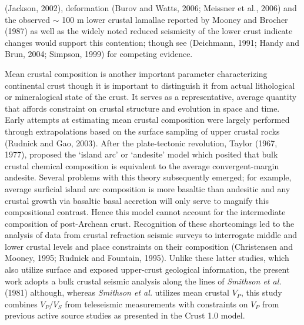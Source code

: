 \documentclass[review]{elsarticle}
\begin{document}
(Jackson, 2002), deformation (Burov and Watts, 2006; Meissner et al., 2006) and the observed $\sim$ 100 m lower crustal lamallae reported by Mooney and Brocher (1987) as well as the widely noted reduced seismicity of the lower crust indicate changes would support this contention; though see (Deichmann, 1991; Handy and Brun, 2004; Simpson, 1999) for competing evidence.

Mean crustal composition is another important parameter characterizing continental crust though it is important to distinguish it from actual lithological or mineralogical state of the crust. It serves as a representative, average quantity that affords constraint on crustal structure and evolution in space and time. Early attempts at estimating mean crustal composition were largely performed through extrapolations based on the surface sampling of upper crustal rocks (Rudnick and Gao, 2003). After the plate-tectonic revolution, Taylor (1967, 1977), proposed the `island arc' or `andesite' model which posited that bulk crustal chemical composition is equivalent to the average convergent-margin andesite. Several problems with this theory subsequently emerged; for example, average surficial island arc composition is more basaltic than andesitic and any crustal growth via basaltic basal accretion will only serve to magnify this compositional contrast. Hence this model cannot account for the intermediate composition of post-Archean crust. Recognition of these shortcomings led to the analysis of data from crustal refraction seismic surveys to interrogate middle and lower crustal levels and place constraints on their composition (Christensen and Mooney, 1995; Rudnick and Fountain, 1995). Unlike these latter studies, which also utilize surface and exposed upper-crust geological information, the present work adopts a bulk crustal seismic analysis along the lines of {\it Smithson et al.} (1981) although, whereas {\it Smithson et al.} utilizes mean crustal $V_P$, this study combines $V_P/V_S$ from teleseismic measurements with constraints on $V_P$ from previous active source studies as presented in the Crust 1.0 model.
\end{document}
